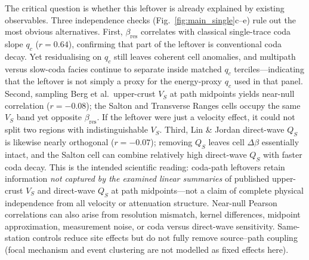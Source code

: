 \documentclass[twocolumn, 10pt]{article}
\begin{document}
The critical question is whether this leftover is already explained by existing observables. Three independence checks (Fig.~\ref{fig:main_single}c--e) rule out the most obvious alternatives. First, \(\beta_{\mathrm{res}}\) correlates with classical single-trace coda slope \(q_c\) (\(r=0.64\)), confirming that part of the leftover is conventional coda decay. Yet residualising on \(q_c\) still leaves coherent cell anomalies, and multipath versus slow-coda facies continue to separate inside matched \(q_c\) terciles—indicating that the leftover is not simply a proxy for the energy-proxy \(q_c\) used in that panel. Second, sampling Berg et al.\ upper-crust \(V_S\) at path midpoints yields near-null correlation (\(r=-0.08\)); the Salton and Transverse Ranges cells occupy the same \(V_S\) band yet opposite \(\beta_{\mathrm{res}}\)\cite{berg2021}. If the leftover were just a velocity effect, it could not split two regions with indistinguishable \(V_S\). Third, Lin \& Jordan direct-wave \(Q_S\) is likewise nearly orthogonal (\(r=-0.07\)); removing \(Q_S\) leaves cell \(\Delta\beta\) essentially intact, and the Salton cell can combine relatively high direct-wave \(Q_S\) with faster coda decay\cite{lin2023}. This is the intended scientific reading: coda-path leftovers retain information \emph{not captured by the examined linear summaries} of published upper-crust \(V_S\) and direct-wave \(Q_S\) at path midpoints---not a claim of complete physical independence from all velocity or attenuation structure. Near-null Pearson correlations can also arise from resolution mismatch, kernel differences, midpoint approximation, measurement noise, or coda versus direct-wave sensitivity\cite{lin2023,delpezzo2023,prudencio2022}. Same-station controls reduce site effects but do not fully remove source--path coupling (focal mechanism and event clustering are not modelled as fixed effects here).
\end{document}
